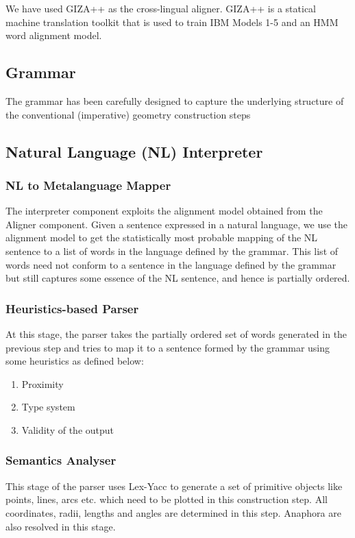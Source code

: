 \def\DevnagVersion{2.15}\documentclass[12pt]{article}
\begin{document}
We have used GIZA++ \cite{och2003systematic} as the cross-lingual aligner. GIZA++ is a statical machine translation toolkit that is used to train IBM Models 1-5 and an HMM word alignment model.\\

\subsection{Grammar}
The grammar has been carefully designed to capture the underlying structure of the conventional (imperative) geometry construction steps\\

\subsection{Natural Language (NL) Interpreter}

\subsubsection{NL to Metalanguage Mapper}
The interpreter component exploits the alignment model obtained from the Aligner component. Given a sentence expressed in a natural language, we use the alignment model to get the statistically most probable mapping of the NL sentence to a list of words in the language defined by the grammar. This list of words need not conform to a sentence in the language defined by the grammar but still captures some essence of the NL sentence, and hence is partially ordered.\\

\subsubsection{Heuristics-based Parser}
At this stage, the parser takes the partially ordered set of words generated in the previous step and tries to map it to a sentence formed by the grammar using some heuristics as defined below:
\begin{enumerate}
\item{Proximity}

\item{Type system}

\item{Validity of the output}

\end{enumerate}

\subsubsection{Semantics Analyser}
This stage of the parser uses Lex-Yacc to generate a set of primitive objects like points, lines, arcs etc. which need to be plotted in this construction step. All coordinates, radii, lengths and angles are determined in this step. Anaphora are also resolved in this stage.
\end{document}
